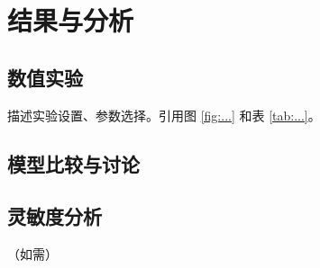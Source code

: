 \section{结果与分析}
\label{sec:results}

\subsection{数值实验}
\label{sec:numerical}
描述实验设置、参数选择。引用图 \ref{fig:...} 和表 \ref{tab:...}。

\subsection{模型比较与讨论}
\label{sec:comparison}

\subsection{灵敏度分析}
\label{sec:sensitivity}
（如需）
